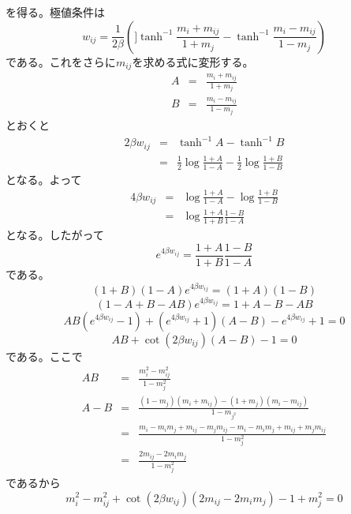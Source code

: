 を得る。極値条件は
\begin{equation}
w_{ij}=\frac{1}{2\beta}\left(]
\tanh^{-1}\frac{m_{i}+m_{ij}}{1+m_{j}}-\tanh^{-1}\frac{m_{i}-m_{ij}}{1-m_{j}}
\right)\label{eq:4.28}
\end{equation}
である。これをさらに$m_{ij}$を求める式に変形する。
\begin{eqnarray}
A&=&\frac{m_{i}+m_{ij}}{1+m_{j}}\nonumber\\
B&=&\frac{m_{i}-m_{ij}}{1-m_{j}}\nonumber
\end{eqnarray}
とおくと
\begin{eqnarray}
2\beta w_{ij}&=&\tanh^{-1}A-\tanh^{-1}B\nonumber\\
&=&\frac{1}{2}\log\frac{1+A}{1-A}-\frac{1}{2}\log\frac{1+B}{1-B}\nonumber
\end{eqnarray}
となる。よって
\begin{eqnarray}
4\beta w_{ij}&=&\log\frac{1+A}{1-A}-\log\frac{1+B}{1-B}\nonumber\\
&=&\log\frac{1+A}{1+B}\frac{1-B}{1-A}\nonumber
\end{eqnarray}
となる。したがって
\begin{equation}
e^{4\beta w_{ij}}=\frac{1+A}{1+B}\frac{1-B}{1-A}\nonumber
\end{equation}
である。
\begin{equation}
(1+B)(1-A)e^{4\beta w_{ij}}=(1+A)(1-B)\nonumber
\end{equation}
\begin{equation}
(1-A+B-AB)e^{4\beta w_{ij}}=1+A-B-AB\nonumber
\end{equation}
\begin{equation}
AB(e^{4\beta w_{ij}}-1)+(e^{4\beta w_{ij}}+1)(A-B)-e^{4\beta
w_{ij}}+1=0\nonumber
\end{equation}
\begin{equation}
AB+\cot(2\beta w_{ij})(A-B)-1=0\nonumber
\end{equation}
である。ここで
\begin{eqnarray}
AB&=&\frac{m_{i}^{2}-m_{ij}^{2}}{1-m_{j}^{2}}\nonumber\\
A-B&=&\frac{(1-m_{j})(m_{i}+m_{ij})-(1+m_{j})(m_{i}-m_{ij})}{1-m_{j^{2}}}\nonumber\\
&=&\frac{m_{i}-m_{i}m_{j}+m_{ij}-m_{j}m_{ij}-m_{i}-m_{i}m_{j}+m_{ij}+m_{j}m_{ij}}
{1-m_{j}^{2}}\nonumber\\
&=&\frac{2m_{ij}-2m_{i}m_{j}}{1-m_{j}^{2}}\nonumber
\end{eqnarray}
であるから
\begin{equation}
m_{i}^{2}-m_{ij}^{2}+\cot(2\beta
w_{ij})(2m_{ij}-2m_{i}m_{j})-1+m_{j}^{2}=0\nonumber
\end{equation}
